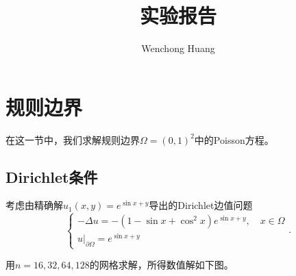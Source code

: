 \documentclass[lang=cn,11pt,a4paper]{elegantpaper}
\title{实验报告}
\author{Wenchong Huang}
\date{\zhtoday}
\begin{document}
\maketitle

\section{规则边界}

在这一节中，我们求解规则边界$\Omega=(0,1)^2$中的Poisson方程。

\subsection{Dirichlet条件}

考虑由精确解$u_1(x,y)=e^{\sin x+y}$导出的Dirichlet边值问题
\begin{equation}
  \left\{
    \begin{array}{l}
      -\Delta u = -(1-\sin x+\cos^2 x)e^{\sin x + y},\quad x\in\Omega \\
      u|_{\partial \Omega}=e^{\sin x + y}
    \end{array}
  \right. .
\end{equation}

用$n=16,32,64,128$的网格求解，所得数值解如下图。
\end{document}
